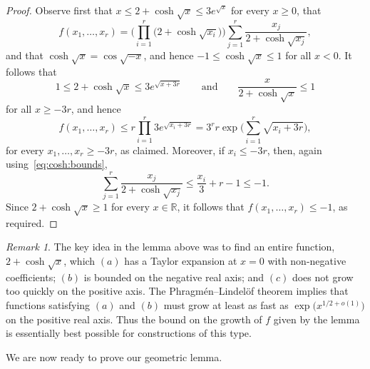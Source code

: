 \documentclass[12pt,reqno]{amsart}
\theoremstyle{definition}
\theoremstyle{remark}
\newtheorem{remark}[theorem]{Remark}
\newcommand\R{\mathbb{R}}
\renewcommand{\le}{\leqslant}
\renewcommand{\ge}{\geqslant}
\def\R{\mathbb{R}}
\begin{document}
\begin{proof}
Observe first that $x \le 2 + \cosh\sqrt{x} \le 3e^{\sqrt{x}}$ for every $x \ge 0$, 
that 
$$f(x_1,\dots,x_r) = \bigg( \prod_{i = 1}^r \big( 2 + \cosh \sqrt{x_i} \big) \bigg) \sum_{j = 1}^r \frac{x_j}{2+\cosh\sqrt{x_j}},$$
and that $\cosh \sqrt{x} = \cos \sqrt{-x}$, and hence $-1 \le \cosh \sqrt{x} \le 1$ for all $x < 0$. It follows that
\begin{equation}\label{eq:cosh:bounds}
1 \le 2 + \cosh\sqrt{x} \le 3e^{\sqrt{x+3r}} \qquad \text{and} \qquad \frac{x}{2+\cosh\sqrt{x}} \le 1
\end{equation}
for all $x \ge -3r$, and hence
$$f(x_1,\dots,x_r)\le r \prod_{i=1}^r 3e^{\sqrt{x_i + 3r}} = 3^r r \exp\bigg(\sum_{i=1}^r \sqrt{x_i + 3r} \bigg),$$
for every $x_1,\ldots,x_r \ge -3r$, as claimed. Moreover, if $x_i \le -3r$, then, again using~\eqref{eq:cosh:bounds}, 
$$\sum_{j = 1}^r \frac{x_j}{2+\cosh\sqrt{x_j}} \le \frac{x_i}{3} + r - 1 \le - 1.$$
Since $2 + \cosh \sqrt{x} \ge 1$ for every $x \in \R$, it follows that $f(x_1,\dots,x_r) \le -1$, as required. 
\end{proof}

\pagebreak

\begin{remark}
The key idea in the lemma above was to find an entire function, $2 + \cosh\sqrt{x}$, which $(a)$ has a Taylor expansion at $x = 0$ with non-negative coefficients; $(b)$ is bounded on the negative real axis; and $(c)$ does not grow too quickly on the positive axis. The Phragm\'en--Lindel\"of theorem %
implies that functions satisfying $(a)$ and $(b)$ must grow at least as fast as $\exp\big( x^{1/2+o(1)} \big)$ on the positive real axis.  Thus the bound on the growth of $f$ given by the lemma is essentially best possible for constructions of this type.
\end{remark}

We are now ready to prove our geometric lemma. 
\end{document}

